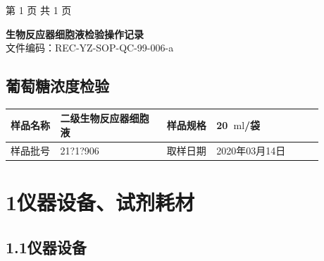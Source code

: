 \documentclass[UTF8,10pt,a4paper,fontset=fandol]{ctexart}
\newcommand{\fieldvalue}[1]{#1}
\newcommand{\handwritten}[1]{#1}
\begin{document}
\vfill
\begin{center}
第 1 页 共 1 页
\end{center}

\newpage

\begin{center}
\textbf{生物反应器细胞液检验操作记录}\\
文件编码：REC-YZ-SOP-QC-99-006-a
\end{center}

\subsection*{葡萄糖浓度检验}

\begin{tabular}{|p{0.14\linewidth}|p{0.30\linewidth}|p{0.14\linewidth}|p{0.30\linewidth}|}
\hline
样品名称 &
\fieldvalue{二级生物反应器细胞液} &
样品规格 &
\fieldvalue{\handwritten{20}}\ \ensuremath{\mathrm{ml}}/袋
\\ \hline
样品批号 &
\fieldvalue{\handwritten{21?1?906}} &
取样日期 &
\fieldvalue{\handwritten{2020年03月14日}}
\\ \hline
\end{tabular}

\section*{1\quad 仪器设备、试剂耗材}

\subsection*{1.1\quad 仪器设备}
\end{document}
